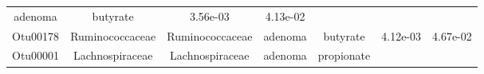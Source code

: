 \documentclass[11pt,]{article}
\begin{document}
\begin{longtable}[]{@{}ccccccc@{}}
\begin{minipage}[t]{0.09\columnwidth}
adenoma\strut
\end{minipage} & \begin{minipage}[t]{0.11\columnwidth}\centering\strut
butyrate\strut
\end{minipage} & \begin{minipage}[t]{0.09\columnwidth}\centering\strut
3.56e-03\strut
\end{minipage} & \begin{minipage}[t]{0.09\columnwidth}\centering\strut
4.13e-02\strut
\end{minipage}\tabularnewline
\begin{minipage}[t]{0.09\columnwidth}\centering\strut
Otu00178\strut
\end{minipage} & \begin{minipage}[t]{0.17\columnwidth}\centering\strut
Ruminococcaceae\strut
\end{minipage} & \begin{minipage}[t]{0.17\columnwidth}\centering\strut
Ruminococcaceae\strut
\end{minipage} & \begin{minipage}[t]{0.09\columnwidth}\centering\strut
adenoma\strut
\end{minipage} & \begin{minipage}[t]{0.11\columnwidth}\centering\strut
butyrate\strut
\end{minipage} & \begin{minipage}[t]{0.09\columnwidth}\centering\strut
4.12e-03\strut
\end{minipage} & \begin{minipage}[t]{0.09\columnwidth}\centering\strut
4.67e-02\strut
\end{minipage}\tabularnewline
\begin{minipage}[t]{0.09\columnwidth}\centering\strut
Otu00001\strut
\end{minipage} & \begin{minipage}[t]{0.17\columnwidth}\centering\strut
Lachnospiraceae\strut
\end{minipage} & \begin{minipage}[t]{0.17\columnwidth}\centering\strut
Lachnospiraceae\strut
\end{minipage} & \begin{minipage}[t]{0.09\columnwidth}\centering\strut
adenoma\strut
\end{minipage} & \begin{minipage}[t]{0.11\columnwidth}\centering\strut
propionate\strut
\end{minipage} & \begin{minipage}[t]{0.09\columnwidth}\centering\strut

\end{minipage}
\end{longtable}
\end{document}
